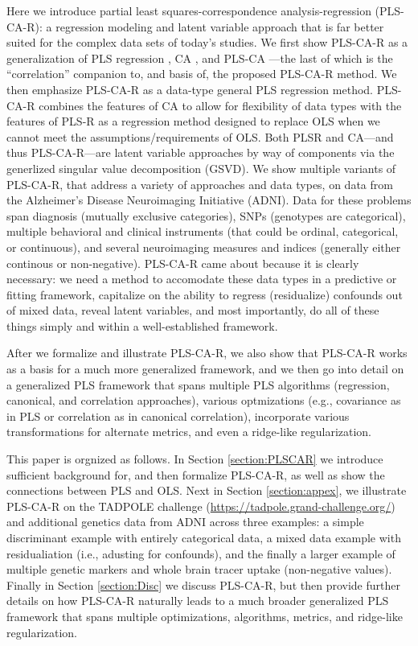 \documentclass[12pt]{article}
\begin{document}
Here we introduce partial least squares-correspondence
analysis-regression (PLS-CA-R): a regression modeling and latent
variable approach that is far better suited for the complex data sets of
today's studies. We first show PLS-CA-R as a generalization of PLS
regression
\citep{wold_soft_1975, wold_collinearity_1984, tenenhaus_regression_1998, abdi_partial_2010-1},
CA
\citep{greenacre_theory_1984, greenacre_correspondence_2010-1, lebart_multivariate_1984},
and PLS-CA \citep{beaton_partial_2016}---the last of which is the
``correlation'' companion to, and basis of, the proposed PLS-CA-R
method. We then emphasize PLS-CA-R as a data-type general PLS regression
method. PLS-CA-R combines the features of CA to allow for flexibility of
data types with the features of PLS-R as a regression method designed to
replace OLS when we cannot meet the assumptions/requirements of OLS.
Both PLSR and CA---and thus PLS-CA-R---are latent variable approaches by
way of components via the generlized singular value decomposition
(GSVD). We show multiple variants of PLS-CA-R, that address a variety of
approaches and data types, on data from the Alzheimer's Disease
Neuroimaging Initiative (ADNI). Data for these problems span diagnosis
(mutually exclusive categories), SNPs (genotypes are categorical),
multiple behavioral and clinical instruments (that could be ordinal,
categorical, or continuous), and several neuroimaging measures and
indices (generally either continous or non-negative). PLS-CA-R came
about because it is clearly necessary: we need a method to accomodate
these data types in a predictive or fitting framework, capitalize on the
ability to regress (residualize) confounds out of mixed data, reveal
latent variables, and most importantly, do all of these things simply
and within a well-established framework.

After we formalize and illustrate PLS-CA-R, we also show that PLS-CA-R
works as a basis for a much more generalized framework, and we then go
into detail on a generalized PLS framework that spans multiple PLS
algorithms (regression, canonical, and correlation approaches), various
optmizations (e.g., covariance as in PLS or correlation as in canonical
correlation), incorporate various transformations for alternate metrics,
and even a ridge-like regularization.

This paper is orgnized as follows. In Section \ref{section:PLSCAR} we
introduce sufficient background for, and then formalize PLS-CA-R, as
well as show the connections between PLS and OLS. Next in Section
\ref{section:appex}, we illustrate PLS-CA-R on the TADPOLE challenge
(\url{https://tadpole.grand-challenge.org/}) and additional genetics
data from ADNI across three examples: a simple discriminant example with
entirely categorical data, a mixed data example with residualiation
(i.e., adusting for confounds), and the finally a larger example of
multiple genetic markers and whole brain tracer uptake (non-negative
values). Finally in Section \ref{section:Disc} we discuss PLS-CA-R, but
then provide further details on how PLS-CA-R naturally leads to a much
broader generalized PLS framework that spans multiple optimizations,
algorithms, metrics, and ridge-like regularization.
\end{document}
